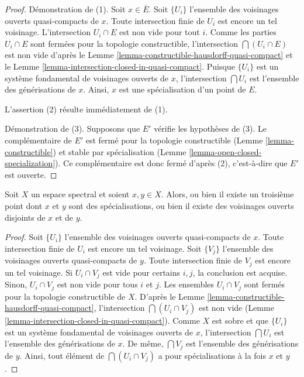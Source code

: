 \begin{proof}
Démonstration de (1). Soit $x \in \overline{E}$. Soit $\{U_i\}$ l'ensemble
des voisinages ouverts quasi-compacts de $x$. Toute intersection finie de
$U_i$ est encore un tel voisinage. L'intersection $U_i \cap E$ est non vide
pour tout $i$. Comme les parties $U_i \cap E$ sont fermées pour la topologie
constructible, l'intersection $\bigcap (U_i \cap E)$ est non vide d'après le
Lemme \ref{lemma-constructible-hausdorff-quasi-compact} et le
Lemme \ref{lemma-intersection-closed-in-quasi-compact}.
Puisque $\{U_i\}$ est un système fondamental de voisinages ouverts de $x$,
l'intersection $\bigcap U_i$ est l'ensemble des générisations de $x$.
Ainsi, $x$ est une spécialisation d'un point de $E$.

\medskip\noindent
L'assertion (2) résulte immédiatement de (1).

\medskip\noindent
Démonstration de (3). Supposons que $E'$ vérifie les hypothèses de (3).
Le complémentaire de $E'$ est fermé pour la topologie constructible
(Lemme \ref{lemma-constructible}) et stable par spécialisation
(Lemme \ref{lemma-open-closed-specialization}).
Ce complémentaire est donc fermé d'après (2), c'est-à-dire que $E'$ est ouverte.
\end{proof}

\begin{lemma}
\label{lemma-two-points}
Soit $X$ un espace spectral et soient $x, y \in X$. Alors, ou bien il existe
un troisième point dont $x$ et $y$ sont des spécialisations, ou bien il existe
des voisinages ouverts disjoints de $x$ et de $y$.
\end{lemma}

\begin{proof}
Soit $\{U_i\}$ l'ensemble des voisinages ouverts quasi-compacts de $x$.
Toute intersection finie de $U_i$ est encore un tel voisinage.
Soit $\{V_j\}$ l'ensemble des voisinages ouverts quasi-compacts de $y$.
Toute intersection finie de $V_j$ est encore un tel voisinage.
Si $U_i \cap V_j$ est vide pour certains $i, j$, la conclusion est acquise.
Sinon, $U_i \cap V_j$ est non vide pour tous $i$ et $j$. Les ensembles
$U_i \cap V_j$ sont fermés pour la topologie constructible de $X$. D'après le
Lemme \ref{lemma-constructible-hausdorff-quasi-compact},
l'intersection $\bigcap (U_i \cap V_j)$ est non vide
(Lemme \ref{lemma-intersection-closed-in-quasi-compact}).
Comme $X$ est sobre et que $\{U_i\}$ est un système fondamental de voisinages
ouverts de $x$, l'intersection $\bigcap U_i$ est l'ensemble des générisations
de $x$. De même, $\bigcap V_j$ est l'ensemble des générisations de $y$.
Ainsi, tout élément de $\bigcap (U_i \cap V_j)$ a pour spécialisations à la
fois $x$ et $y$.
\end{proof}

